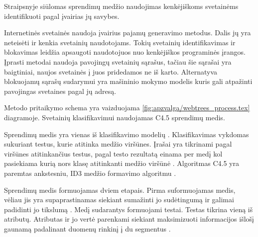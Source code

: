 
Straipsnyje  siūlomas sprendimų medžio naudojimas kenkėjiškoms svetainėms identifikuoti pagal įvairias jų savybes.


Internetinės svetainės naudoja įvairius pajamų generavimo metodus. Dalis jų yra neteisėti ir kenkia svetainių naudotojams. Tokių svetainių identifikavimas ir blokavimas leidžia apsaugoti naudotojuos nuo kenkėjiškos programinės įrangos. Įprasti metodai naudoja pavojingų svetainių sąrašus, tačiau šie sąrašai yra baigtiniai, naujos svetainės į juos pridedamos ne iš karto. Alternatyva blokuojamų sąrašų sudarymui yra mašininio mokymo modelis kuris gali atpažinti pavojingas svetaines pagal jų adresą.



Metodo pritaikymo schema yra vaizduojama \vref{fig:apzvalga/webtrees_process.tex} diagramoje. Svetainių klasifikavimui naudojamas C4.5 sprendimų medis.


Sprendimų medis yra vienas iš klasifikavimo modelių \cite{c45}. Klasifikavimas vykdomas sukuriant testus, kurie atitinka medžio viršūnes. Įrašai yra tikrinami pagal viršūnes atitinkančius testus, pagal testo rezultatą einama per medį kol pasiekiama kurią nors klasę atitinkanti medžio viršūnė \cite{trees}. Algoritmas C4.5 yra paremtas ankstesniu, ID3 medžio formavimo algoritmu \cite{c45}.

Sprendimų medis formuojamas dviem etapais. Pirma suformuojamas medis, vėliau jis yra supaprastinamas siekiant sumažinti jo sudėtingumą ir galimai padidinti jo tikslumą \cite{c45}. Medį sudarantys formuojami testai. Testas tikrina vieną iš atributų. Atributas ir jo vertė parenkami siekiant maksimizuoti informacijos išlošį gaunamą padalinant duomenų rinkinį į du segmentus \cite{Wu2008}.

